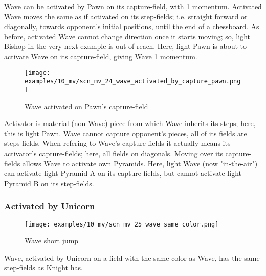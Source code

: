 \vspace*{-0.5\baselineskip}
Wave can be activated by Pawn on its capture-field, with 1 momentum. Activated
Wave moves the same as if activated on its step-fields; i.e. straight forward or
diagonally, towards opponent's initial positions, until the end of a chessboard.
As before, activated Wave cannot change direction once it starts moving; so, light
Bishop in the very next example is out of reach. \newline
\indent
Here, light Pawn is about to activate Wave on its capture-field, giving Wave 1
momentum.

\clearpage %

\vspace*{-2.1\baselineskip}
\noindent
\begin{figure}[!h]
\texttt{[image: examples/10\_mv/scn\_mv\_24\_wave\_activated\_by\_capture\_pawn.png]}
\vspace*{-1.4\baselineskip}
\caption{Wave activated on Pawn's capture-field}
\label{fig:scn_mv_24_wave_activated_by_capture_pawn}
\end{figure}

\vspace*{-0.5\baselineskip}
\hyperref[sec:Terms/Activator]{Activator} is material (non-Wave) piece from which
Wave inherits its steps; here, this is light Pawn. Wave cannot capture opponent's
pieces, all of its fields are steps-fields. When refering to Wave's capture-fields
it actually means its activator's capture-fields; here, all fields on diagonals. \newline
\indent
Moving over its capture-fields allows Wave to activate own Pyramids. Here, light
Wave (now "in-the-air") can activate light Pyramid A on its capture-fields, but
cannot activate light Pyramid B on its step-fields.

\clearpage %

\subsubsection*{Activated by Unicorn}
\label{sec:Miranda's veil/Wave/Movement/Activated by Unicorn}

\vspace*{-0.7\baselineskip}
\noindent
\begin{wrapfigure}[10]{l}{0.45\textwidth}
\centering
\texttt{[image: examples/10\_mv/scn\_mv\_25\_wave\_same\_color.png]}
\vspace*{-0.3\baselineskip}
\caption{Wave short jump}
\label{fig:scn_mv_25_wave_same_color}
\end{wrapfigure}
Wave, activated by Unicorn on a field with the same color as Wave, has the same step-fields
as Knight has.

